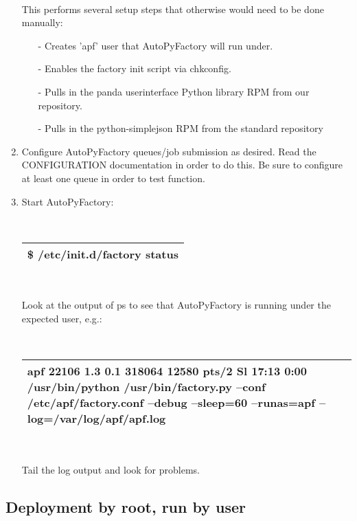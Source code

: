 \documentclass[a4paper]{jpconf}
\begin{document}
\begin{enumerate}
~

This performs several setup steps that otherwise would need to be done manually:
\begin{enumerate}
\item[-] Creates 'apf' user that AutoPyFactory will run under. 
\item[-] Enables the factory init script via chkconfig. 
\item[-] Pulls in the panda userinterface Python library RPM from our repository. 
\item[-] Pulls in the python-simplejson RPM from the standard repository
\end{enumerate}
\item Configure AutoPyFactory queues/job submission as desired. 
Read the CONFIGURATION documentation in order to do this. 
Be sure to configure at least one queue in order to test function.
\item Start AutoPyFactory:


~

\begin{tabular}{|p{16cm}|}
   \hline
\$ /etc/init.d/factory status \\
   \hline
\end{tabular}
~

Look at the output of ps to see that AutoPyFactory is running under the expected user, e.g.:


~

\begin{tabular}{|p{16cm}|}
   \hline
apf    22106 1.3 0.1 318064 12580 pts/2  Sl 17:13 0:00 /usr/bin/python /usr/bin/factory.py --conf /etc/apf/factory.conf --debug --sleep=60 --runas=apf --log=/var/log/apf/apf.log \\
   \hline
\end{tabular}
~

Tail the log output and look for problems.
\end{enumerate}

\subsection{Deployment by root, run by user}
\end{document}
